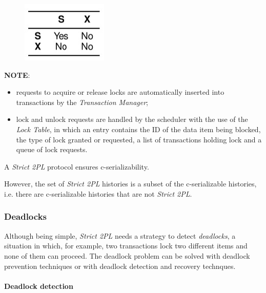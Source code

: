 \begin{figure}[h!]
		\centering
		\includegraphics[scale = 1.5]{img/conc6.jpg}
		\label{conc5}
\end{figure}

\textbf{NOTE}: 
\begin{itemize}

    \item requests to acquire or release locks are automatically inserted into transactions by the \textit{Transaction Manager};
    
    \item lock and unlock requests are handled by the scheduler with the use of the \textit{Lock Table}, in which an entry contains the ID of the data item being blocked, the type of lock granted or requested, a list of transactions holding lock and a queue of lock requests.
    
\end{itemize}

\begin{tcolorbox}[title = C-Serializability of Strict 2PL]
    A \textit{Strict 2PL} protocol ensures c-serializability.
\end{tcolorbox}

However, the set of \textit{Strict 2PL} histories is a subset of the c-serializable histories, i.e. there are c-serializable histories that are not \textit{Strict 2PL}.

\subsubsection{Deadlocks}

Although being simple, \textit{Strict 2PL} needs a strategy to detect \textit{deadlocks}, a situation in which, for example, two transactions lock two different items and none of them can proceed. The deadlock problem can be solved with deadlock prevention techniques or with deadlock detection and recovery technques.

\paragraph{Deadlock detection}

